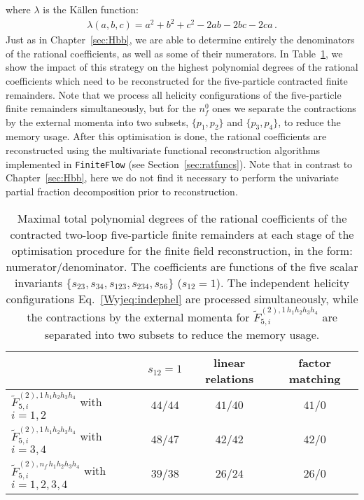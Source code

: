 \documentclass[main.tex]{subfiles}
\begin{document}
where $\lambda$ is the K\"allen function:
\begin{align}
\lambda(a,b,c) = a^2 + b^2 + c^2 - 2 a b - 2 b c - 2 c a \,.
\end{align}
Just as in Chapter~\ref{sec:Hbb}, we are able to determine entirely the denominators of the rational coefficients, as well as some of their numerators. In Table~\ref{Wyjtab:degrees}, we show the impact of this strategy on the highest polynomial degrees of the rational coefficients which need to be reconstructed for the five-particle contracted finite remainders. Note that we process all helicity configurations of the five-particle finite remainders simultaneously, but for the $n_f^0$ ones we separate the contractions by the external momenta into two subsets, $\{p_1,p_2\}$ and $\{p_3,p_4\}$, to reduce the memory usage.
After this optimisation is done, the rational coefficients are reconstructed using the multivariate functional reconstruction algorithms implemented in \texttt{FiniteFlow} (see Section~\ref{sec:ratfuncs}). Note that in contrast to Chapter~\ref{sec:Hbb}, here we do not find it necessary to perform the univariate partial fraction decomposition prior to reconstruction.
\begin{table}[t!]
\begin{center}
\begin{tabular}{l|c|c|c}
 & $s_{12}=1$ & linear relations & factor matching \\
\hline
$\tilde{F}_{5,i}^{(2),1\, h_1 h_2 h_3 h_4}$ with $i=1,2$     & $44/44$ & $41/40$ & $41/0$ \\
$\tilde{F}_{5,i}^{(2),1\, h_1 h_2 h_3 h_4}$ with $i=3,4$     & $48/47$ & $42/42$ & $42/0$ \\
$\tilde{F}_{5,i}^{(2),n_f\, h_1 h_2 h_3 h_4}$ with $i=1,2,3,4$ & $39/38$ & $26/24$ & $26/0$ \\
\end{tabular}
\end{center}
\caption{Maximal total polynomial degrees of the rational coefficients of the contracted two-loop five-particle finite remainders at each stage of the optimisation procedure for the finite field reconstruction, in the form: numerator/denominator. The coefficients are  functions of the five scalar invariants $\{s_{23},s_{34},s_{123},s_{234},s_{56}\}$ ($s_{12}=1$). The independent helicity configurations Eq.~\ref{Wyjeq:indephel} are processed simultaneously, while the contractions by the external momenta for $\tilde{F}_{5,i}^{(2),1\, h_1 h_2 h_3 h_4}$ are separated into two subsets to reduce the memory usage.}
\label{Wyjtab:degrees}
\end{table}
\end{document}
